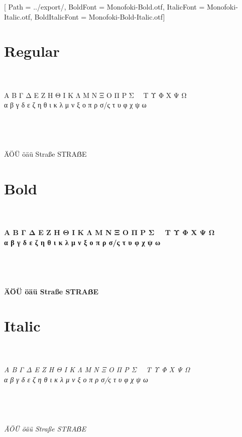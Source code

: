 \documentclass[12pt, a4paper]{article}
\begin{document}
\setmainfont{Monofoki-Regular.otf}[
Path = ../export/,
BoldFont = Monofoki-Bold.otf,
ItalicFont = Monofoki-Italic.otf,
BoldItalicFont  = Monofoki-Bold-Italic.otf]

\section*{Regular}

\noindent\AZtext\\
\noindent\aztext\\
\noindent Α Β Γ Δ Ε Ζ Η Θ Ι Κ Λ Μ Ν Ξ Ο Π Ρ Σ~~ Τ Υ Φ Χ Ψ Ω\\
\noindent α β γ δ ε ζ η θ ι κ λ μ ν ξ ο π ρ σ/ς τ υ φ χ ψ ω\\
\noindent\digitstext\\
\noindent\punctext\\

\lipsum[0-1]
~\\
~\\
\noindent ÄÖÜ öäü Straße STRAẞE\\

\newpage

\section*{Bold}

\noindent\textbf{%
\noindent\AZtext\\
\noindent\aztext\\
\noindent Α Β Γ Δ Ε Ζ Η Θ Ι Κ Λ Μ Ν Ξ Ο Π Ρ Σ~~ Τ Υ Φ Χ Ψ Ω\\
\noindent α β γ δ ε ζ η θ ι κ λ μ ν ξ ο π ρ σ/ς τ υ φ χ ψ ω\\
\noindent\digitstext\\
\noindent\punctext\\
~
\lipsum[0-1]
~\\
~\\
\noindent ÄÖÜ öäü Straße STRAẞE\\
}

\newpage

\section*{Italic}

\noindent\textit{%
\noindent\AZtext\\
\noindent\aztext\\
\noindent Α Β Γ Δ Ε Ζ Η Θ Ι Κ Λ Μ Ν Ξ Ο Π Ρ Σ~~ Τ Υ Φ Χ Ψ Ω\\
\noindent α β γ δ ε ζ η θ ι κ λ μ ν ξ ο π ρ σ/ς τ υ φ χ ψ ω\\
\noindent\digitstext\\
\noindent\punctext\\
~
\lipsum[0-1]
~\\
~\\
\noindent ÄÖÜ öäü Straße STRAẞE\\
}
\end{document}
